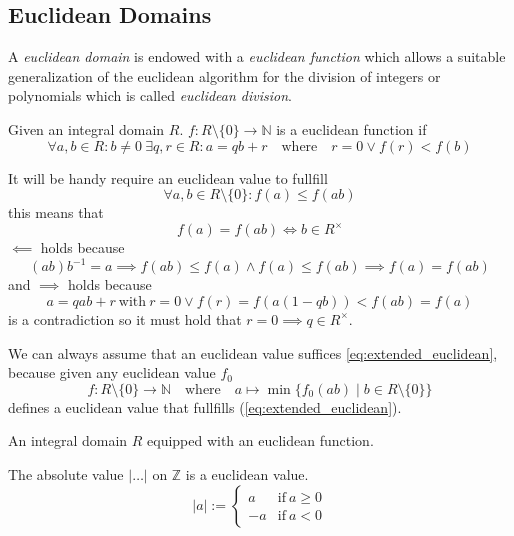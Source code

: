 \subsection{Euclidean Domains}
A \emph{euclidean domain} is endowed with a \emph{euclidean function} which allows a suitable generalization of the euclidean algorithm for the division of integers or polynomials which is called \emph{euclidean division}.

\begin{definition}
   Given an integral domain \(R\).
   \(f: R \setminus \{0\} \to \mathbb{N}\) is a euclidean function if
   \[\forall a, b \in R: b \neq 0~\exists q, r \in R: a = qb + r \quad\text{where}\quad r = 0 \lor f(r) < f(b)\]
\end{definition}
\begin{remark}
   It will be handy require an euclidean value to fullfill
   \begin{equation}\label{eq:extended_euclidean}
      \forall a,b \in R \setminus \{0\}: f(a) \leq f(ab)
   \end{equation}
   this means that
   \[f(a) = f(ab) \iff b \in R^{\times}\]
   \(\impliedby\) holds because
   \[(ab)b^{-1} = a \implies f(ab) \leq f(a) \land f(a) \leq f(ab) \implies f(a) = f(ab)\]
   and \(\implies\) holds because
   \[a = qab + r~\text{with}~r=0 \lor f(r) = f(a(1-qb)) < f(ab) = f(a)\]
   is a contradiction so it must hold that \(r = 0 \implies q \in R^{\times}\).

   We can always assume that an euclidean value suffices \cref{eq:extended_euclidean}, because given any euclidean value \(f_0\)
   \[f: R \setminus \{0\} \to \mathbb{N} \quad\text{where}\quad a \mapsto \min\{f_0(ab) \mid b \in R \setminus \{0\}\}\]
   defines a euclidean value that fullfills (\ref{eq:extended_euclidean}).
\end{remark}

\begin{definition}
   An integral domain \(R\) equipped with an euclidean function.
\end{definition}

\begin{proposition}
   The absolute value \(|\ldots|\) on \(\mathbb{Z}\) is a euclidean value.
   \[|a| := \begin{cases} a & \text{if}~a \geq 0\\ -a & \text{if}~a < 0\end{cases}\]
\end{proposition}


